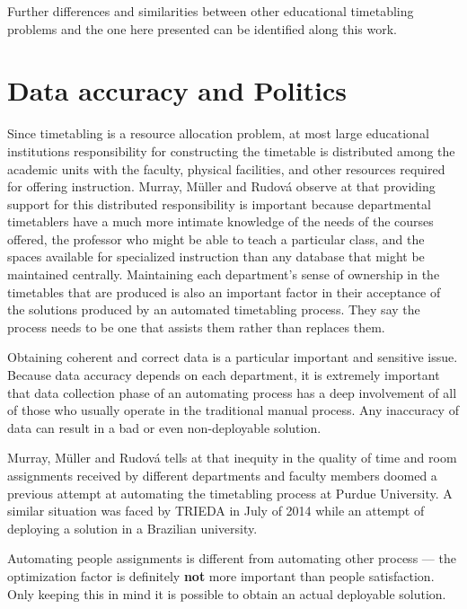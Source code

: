 Further differences and similarities between other educational timetabling problems and the one here presented can be identified along this work.


\section{Data accuracy and Politics}
\label{sec:accuracy}

Since timetabling is a resource allocation problem, at most large educational institutions responsibility for constructing the timetable is distributed among the academic units with the faculty, physical facilities, and other resources required for offering instruction. Murray, M\"{u}ller and Rudov\'{a} observe at \cite{Murray2007} that providing support for this distributed responsibility is important because departmental timetablers have a much more intimate knowledge of the needs of the courses offered, the professor who might be able to teach a particular class, and the spaces available for specialized instruction than any database that might be maintained centrally. Maintaining each department's sense of ownership in the timetables that are produced is also an important factor in their acceptance of the solutions produced by an automated timetabling process. They say the process needs to be one that assists them rather than replaces them.

Obtaining coherent and correct data is a particular important and sensitive issue. Because data accuracy depends on each department, it is extremely important that data collection phase of an automating process has a deep involvement of all of those who usually operate in the traditional manual process. Any inaccuracy of data can result in a bad or even non-deployable solution.

Murray, M\"{u}ller and Rudov\'{a} tells at \cite{Murray2007} that inequity in the quality of time and room assignments received by different departments and faculty members doomed a previous attempt at automating the timetabling process at Purdue University. A similar situation was faced by TRIEDA in July of 2014 while an attempt of deploying a solution in a Brazilian university.

Automating people assignments is different from automating other process --- the optimization factor is definitely \textbf{not} more important than people satisfaction. Only keeping this in mind it is possible to obtain an actual deployable solution.

